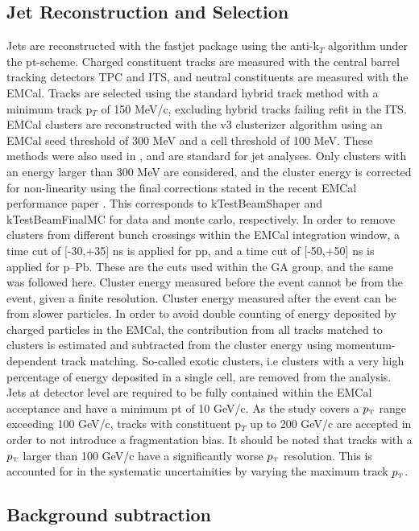 \documentclass[ALICE]{ALICE_analysis_notes}
\newcommand{\pT}{$p_{\mbox{\tiny T}}$\xspace}
\newcommand{\pPb}{{\mbox{p--Pb}}\xspace}
\newcommand{\pp}{pp\xspace}
\begin{document}
\subsection{Jet Reconstruction and Selection}
\label{sec:JetRecoSel}

Jets are reconstructed with the fastjet package using the anti-k$_T$ algorithm under the pt-scheme. Charged constituent tracks are measured with the central barrel tracking detectors TPC and ITS, and neutral constituents are measured with the EMCal. Tracks are selected using the standard hybrid track method with a minimum track p$_T$ of 150 MeV/c, excluding hybrid tracks failing refit in the ITS. EMCal clusters are reconstructed with the v3 clusterizer algorithm using an EMCal seed threshold of 300 MeV and a cell threshold of 100 MeV. These methods were also used in \cite{anaNoteMFasel}, and are standard for jet analyses. Only clusters with an energy larger than 300 MeV are considered, and the cluster energy is corrected for non-linearity using the final corrections stated in the recent EMCal performance paper \cite{EMCalPerformance2022}. This corresponds to kTestBeamShaper and kTestBeamFinalMC for data and monte carlo, respectively. In order to remove clusters from different bunch crossings within the EMCal integration window, a time cut of [-30,+35] ns is applied for \pp, and a time cut of [-50,+50] ns is applied for \pPb. These are the cuts used within the GA group, and the same was followed here. Cluster energy measured before the event cannot be from the event, given a finite resolution. Cluster energy measured after the event can be from slower particles. In order to avoid double counting of energy deposited by charged particles in the EMCal, the contribution from all tracks matched to clusters is estimated and subtracted from the cluster energy using momentum-dependent track matching. So-called exotic clusters, i.e clusters with a very high percentage of energy deposited in a single cell, are removed from the analysis. Jets at detector level are required to be fully contained within the EMCal acceptance and have a minimum pt of 10 GeV/c. As the study covers a \pT range exceeding 100 GeV/c, tracks with constituent p$_T$ up to 200 GeV/c are accepted in order to not introduce a fragmentation bias. It should be noted that tracks with a \pT larger than 100 GeV/c have a significantly worse \pT resolution. This is accounted for in the systematic uncertainities by varying the maximum track \pT.

\subsection{Background subtraction}
\label{sec:backgroundSubtraction}
\end{document}
